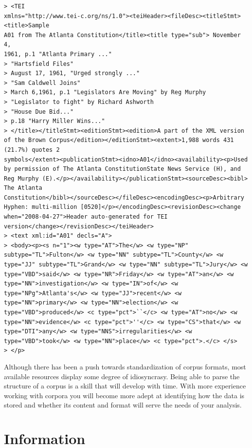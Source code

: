 \documentclass[
  letterpaper,
]{latex/krantz}
\begin{document}
\begin{verbatim}
> <TEI
xmlns="http://www.tei-c.org/ns/1.0"><teiHeader><fileDesc><titleStmt><title>Sample
A01 from The Atlanta Constitution</title><title type="sub"> November 4,
1961, p.1 "Atlanta Primary ..."
> "Hartsfield Files"
> August 17, 1961, "Urged strongly ..."
> "Sam Caldwell Joins"
> March 6,1961, p.1 "Legislators Are Moving" by Reg Murphy
> "Legislator to fight" by Richard Ashworth
> "House Due Bid..."
> p.18 "Harry Miller Wins..."
> </title></titleStmt><editionStmt><edition>A part of the XML version
of the Brown Corpus</edition></editionStmt><extent>1,988 words 431
(21.7%) quotes 2
symbols</extent><publicationStmt><idno>A01</idno><availability><p>Used
by permission of The Atlanta ConstitutionState News Service (H), and
Reg Murphy (E).</p></availability></publicationStmt><sourceDesc><bibl>
The Atlanta
Constitution</bibl></sourceDesc></fileDesc><encodingDesc><p>Arbitrary
Hyphen: multi-million [0520]</p></encodingDesc><revisionDesc><change
when="2008-04-27">Header auto-generated for TEI
version</change></revisionDesc></teiHeader>
> <text xml:id="A01" decls="A">
> <body><p><s n="1"><w type="AT">The</w> <w type="NP"
subtype="TL">Fulton</w> <w type="NN" subtype="TL">County</w> <w
type="JJ" subtype="TL">Grand</w> <w type="NN" subtype="TL">Jury</w> <w
type="VBD">said</w> <w type="NR">Friday</w> <w type="AT">an</w> <w
type="NN">investigation</w> <w type="IN">of</w> <w
type="NPg">Atlanta's</w> <w type="JJ">recent</w> <w
type="NN">primary</w> <w type="NN">election</w> <w
type="VBD">produced</w> <c type="pct">``</c> <w type="AT">no</w> <w
type="NN">evidence</w> <c type="pct">''</c> <w type="CS">that</w> <w
type="DTI">any</w> <w type="NNS">irregularities</w> <w
type="VBD">took</w> <w type="NN">place</w> <c type="pct">.</c> </s>
> </p>
\end{verbatim}

Although there has been a push towards standardization of corpus
formats, most available resources display some degree of idiosyncrasy.
Being able to parse the structure of a corpus is a skill that will
develop with time. With more experience working with corpora you will
become more adept at identifying how the data is stored and whether its
content and format will serve the needs of your analysis.

\hypertarget{information}{%
\section{Information}\label{information}}
\end{document}
